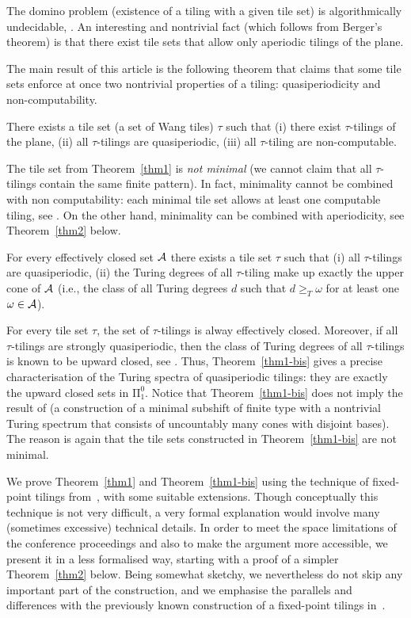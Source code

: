 \documentclass[runningheads]{llncs}
\begin{document}
The domino problem (existence of a tiling with a given tile set) is algorithmically undecidable, \cite{berger}.  An interesting and nontrivial fact (which follows from Berger's theorem) is that there exist tile sets that allow only aperiodic tilings of the plane.

The main result of this article is the following theorem that claims that some tile sets enforce at once two nontrivial properties of a tiling: 
quasiperiodicity and non-computability.
\begin{theorem}\label{thm1}
There exists a tile set \textup(a set of Wang tiles\textup) $\tau$ such that 
(i) there exist $\tau$-tilings of the plane,
(ii) all $\tau$-tilings are quasiperiodic,
(iii) all $\tau$-tiling are non-computable.
\end{theorem}
The tile set from Theorem~\ref{thm1} is \emph{not minimal} (we cannot claim that all $\tau$-tilings contain the same finite pattern). In fact, minimality cannot be combined with non computability: each minimal tile set allows at least one computable tiling, see \cite{ballier-jeandel}.
On the other hand, minimality can be combined with aperiodicity, see Theorem~\ref{thm2} below.


\begin{theorem}\label{thm1-bis}
For every effectively closed set  $\cal A$ there exists a tile set $\tau$ such that 
(i) all $\tau$-tilings are quasiperiodic,
(ii) the Turing degrees of all $\tau$-tiling make up exactly the upper cone of  ${\cal A}$ (i.e.,  the class of all Turing degrees $d$ such that $d\ge_T \omega $ for at least one $\omega\in {\cal A}$).

\end{theorem}
For every tile set $\tau$, the set of $\tau$-tilings is alway effectively closed. Moreover, if all $\tau$-tilings are strongly quasiperiodic, then the class of Turing degrees of all $\tau$-tilings is known to be upward closed, see \cite{pascal2}. Thus, Theorem~\ref{thm1-bis} gives a precise characterisation of the Turing spectra of quasiperiodic tilings: they are exactly the upward closed sets in $\mathrm \Pi_1^0$.
Notice that Theorem~\ref{thm1-bis} does not imply the result of \cite{pascal3} (a construction of a minimal subshift of finite type with a nontrivial Turing spectrum that consists of uncountably many cones with disjoint bases). The reason is again that the tile sets constructed in Theorem~\ref{thm1-bis} are not minimal.


We prove Theorem~\ref{thm1} and Theorem~\ref{thm1-bis} using the technique of fixed-point tilings from~\cite{drs}, with some suitable extensions. Though conceptually this technique is  not very difficult,  a very formal explanation would involve many (sometimes excessive) technical  details. 
In order to meet the space limitations of the conference proceedings and also to make the argument more accessible, we present it in a less formalised way, starting with a proof of a simpler Theorem~\ref{thm2} below. Being somewhat sketchy, we nevertheless do not skip any important part of the construction, and  we emphasise the parallels and differences with the previously known construction of a  fixed-point tilings in~\cite{drs}.
\end{document}
